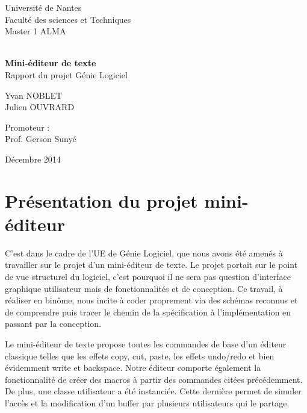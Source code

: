 \documentclass[a4paper,11pt]{article}
\begin{document}
\thispagestyle{empty}

{%
\sffamily
\centering
\Large
Université de Nantes\\
Faculté des sciences et Techniques\\
Master 1 ALMA\\

~\vspace{\fill}

{\huge 
\textbf{Mini-éditeur de texte}\\Rapport du projet Génie Logiciel
}

\vspace{4cm}

{\LARGE Yvan NOBLET}\\
{\LARGE Julien OUVRARD}\\

\vspace{7cm}

Promoteur :\\ Prof. Gerson Sunyé

\vspace{\fill}

Décembre 2014

}
\clearpage

%
%

\tableofcontents
\clearpage

%
%

\section{Présentation du projet mini-éditeur}\label{sec:intro}
\bigskip

C'est dans le cadre de l'UE de Génie Logiciel, que nous avons été amenés à travailler sur le projet d'un mini-éditeur de texte. Le projet portait sur le point de vue structurel du logiciel, c'est pourquoi il ne sera pas question d'interface graphique utilisateur mais de fonctionnalités et de conception.
Ce travail, à réaliser en binôme, nous incite à coder proprement via des schémas reconnus et de comprendre puis tracer le chemin de la spécification à l'implémentation en passant par la conception.
\bigskip

\noindent Le mini-éditeur de texte propose toutes les commandes de base d'un éditeur classique telles que les effets copy, cut, paste, les effets undo/redo et bien évidemment write et backspace. Notre éditeur comporte également la fonctionnalité de créer des macros à partir des commandes citées précédemment.
De plus, une classe utilisateur a été instanciée. Cette dernière permet de simuler l'accès et la modification d'un buffer par plusieurs utilisateurs qui le partage.
\bigskip
\end{document}
